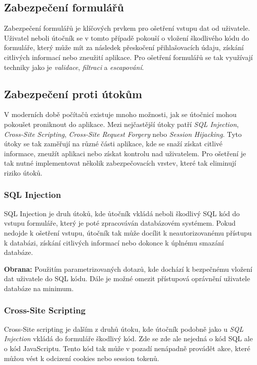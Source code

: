 \subsection{Zabezpečení formulářů}
\label{subsec:security-forms}
Zabezpečení formulářů je klíčových prvkem pro ošetření vstupu dat od uživatele. Uživatel neboli útočník se v tomto případě pokouší o vložení škodlivého kódu do formuláře, který může mít za následek přeskočení přihlašovacích údaju, získání citlivých informací nebo zneužití aplikace. Pro ošetření formulářů se tak využívají techniky jako je \textit{validace}, \textit{filtraci} a \textit{escapování}.

\subsection{Zabezpečení proti útokům}
\label{subsec:security-attacks}
V moderních době počítačů existuje mnoho možnosti, jak se útočnicí mohou pokoušet proniknout do aplikace. Mezi nejčastější útoky patří \textit{SQL Injection}, \textit{Cross-Site Scripting}, \textit{Cross-Site Request Forgery} nebo \textit{Session Hijacking}. Tyto útoky se tak zaměřují na různé části aplikace, kde se snaží získat citlivé informace, zneužít aplikaci nebo získat kontrolu nad uživatelem. Pro ošetření je tak nutné implementovat několik zabezpečovacích vrstev, které tak eliminují riziko útoků.

\subsubsection*{SQL Injection}
\label{subsubsec:security-attacks-sql-injection}
SQL Injection je druh útoků, kde ůtočník vkládá neboli  škodlivý SQL kód do vstupu formuláře, který je poté zpracováván databázovém systémem. Pokud nedojde k ošetření vstupu, útočník tak může docílit k neautorizovanému přístupu k databázi, získání citlivých informací nebo dokonce k úplnému smazání databáze.

\textbf{Obrana:} Použitím parametrizovaných dotazů, kde dochází k bezpečnému vložení dat uživatele do SQL kódu. Dále je možné omezit přístupová oprávnění uživatele databáze na minimum.

\subsubsection*{Cross-Site Scripting}
\label{subsubsec:security-attacks-cross-site-scripting}
Cross-Site scripting je dalším z druhů útoku, kde útočník podobně jako u \textit{SQL Injection} vkládá do formuláře škodlivý kód. Zde se zde ale nejedná o kód SQL ale o kód JavaScriptu. Tento kód tak může v pozadí nenápadně provádět akce, které můžou vést k odcizení cookies nebo session tokenů.

